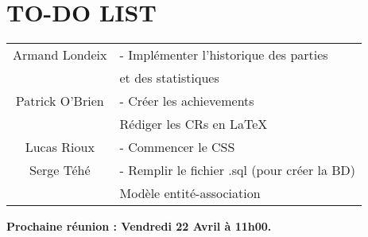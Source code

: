 \section*{TO-DO LIST}

\begin{center}
\begin{tabular}{|c|l|}
    \hline
    Armand Londeix & - Implémenter l'historique des parties \\
    & et des statistiques \\
    \hline
    Patrick O'Brien & - Créer les achievements \\
    & Rédiger les CRs en \LaTeX{} \\
    \hline
    Lucas Rioux & - Commencer le CSS \\
    \hline
    Serge Téhé & - Remplir le fichier .sql (pour créer la BD) \\
    & Modèle entité-association \\
    \hline
\end{tabular}
\end{center}

\tabto{0cm}\textbf{Prochaine réunion : Vendredi 22 Avril à 11h00.}